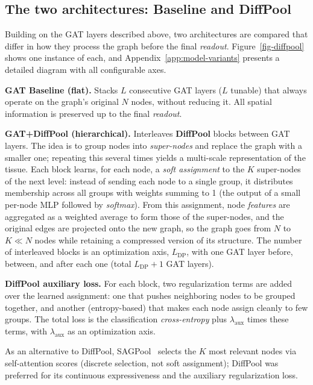 \documentclass[10pt,a4paper,twocolumn,twoside]{article}
\begin{document}
\subsection{The two architectures: Baseline and DiffPool}
\label{sec:architectures}

Building on the GAT layers described above, two architectures are compared that differ in
how they process the graph before the final \textit{readout}. Figure~\ref{fig-diffpool}
shows one instance of each, and Appendix~\ref{app:model-variants} presents a
detailed diagram with all configurable axes.

\textbf{GAT Baseline (flat).} Stacks $L$ consecutive GAT layers ($L$ tunable)
that always operate on the graph's original $N$ nodes, without reducing it. All
spatial information is preserved up to the final \textit{readout}.

\textbf{GAT+DiffPool (hierarchical).} Interleaves \textbf{DiffPool}
\cite{ying2019hierarchicalgraphrepresentationlearning} blocks between GAT layers. The idea is to
group nodes into \textit{super-nodes} and replace the graph with a smaller one; repeating this
several times yields a multi-scale representation of the tissue. Each block learns, for each
node, a \textit{soft assignment} to the $K$ super-nodes of the next level:
instead of sending each node to a single group, it distributes membership across all groups with weights
summing to 1 (the output of a small per-node MLP followed by \textit{softmax}). From this
assignment, node \textit{features} are aggregated as a weighted average to form those of the
super-nodes, and the original edges are projected onto the new graph, so the graph goes from $N$ to
$K \ll N$ nodes while retaining a compressed version of its structure. The number of interleaved
blocks is an optimization axis, $L_{\text{DP}}$, with one GAT layer before, between, and after
each one (total $L_{\text{DP}}+1$ GAT layers).

\textbf{DiffPool auxiliary loss.} For each block, two regularization terms are added over the
learned assignment: one that pushes neighboring nodes to be grouped together, and another (entropy-based) that makes
each node assign cleanly to few groups. The total loss is the classification
\textit{cross-entropy} plus $\lambda_{\text{aux}}$ times these terms, with $\lambda_{\text{aux}}$ as an
optimization axis.

As an alternative to DiffPool, SAGPool~\cite{lee2019selfattentiongraphpooling} selects the $K$
most relevant nodes via self-attention scores (discrete selection, not soft assignment); DiffPool was
preferred for its continuous expressiveness and the auxiliary regularization loss.
\end{document}
